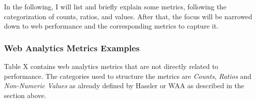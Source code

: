 In the following, I will list and briefly explain some metrics, following the categorization of counts, ratios, and values.
After that, the focus will be narrowed down to web performance and the corresponding metrics to capture it.




\subsubsection{Web Analytics Metrics Examples} %
\label{subsubsection:web_analytics_metrics_examples}

Table X contains web analytics metrics that are not directly related to performance.
The categories used to structure the metrics are \textit{Counts}, \textit{Ratios} and \textit{Non-Numeric Values} as already defined by Hassler or WAA as described in the section above.





